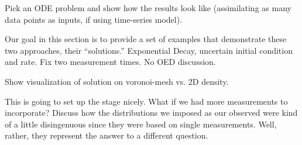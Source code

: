 Pick an ODE problem and show how the results look like (assimilating as many data points as inputs, if using time-series model). 

Our goal in this section is to provide a set of examples that demonstrate these two approaches, their ``solutions.''
Exponential Decay, uncertain initial condition and rate. Fix two measurement times. No OED discussion.

Show visualization of solution on voronoi-mesh vs. 2D density. 

This is going to set up the stage nicely.
What if we had more measurements to incorporate? Discuss how the distributions we imposed as our observed were kind of a little disingenuous since they were based on single measurements. Well, rather, they represent the answer to a different question.


